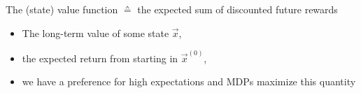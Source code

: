 \begin{frame}\frametitle{\subsecname}

The (state) value function $\corresponds$ the expected sum of discounted future rewards


\begin{itemize}
\item The long-term value of some state $\vec x$,
\item the expected return from starting in $\vec x^{(0)}$,
\item we have a preference for high expectations and MDPs maximize this quantity
\end{itemize}

\end{frame}

